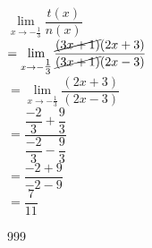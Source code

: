 \documentclass[a4paper]{article}
\newcommand{\llim}{\lim\limits}
\begin{document}
$\llim_{x \rightarrow -\tfrac{1}{3}} \dfrac{t(x)}{n(x)}$ \\ 

$= \llim_{x \rightarrow -\tfrac{1}{3}} \dfrac{\cancel{(3x+1)}(2x+3)}{\cancel{(3x+1)}(2x-3)}$ \\

$= \llim_{x \rightarrow -\tfrac{1}{3}} \dfrac{(2x+3)}{(2x-3)}$ \\

$= \dfrac{\dfrac{-2}{3} + \dfrac{9}{3}}{\dfrac{-2}{3} - \dfrac{9}{3}}$ \\

$= \dfrac{-2+9}{-2-9}$ \\

$= \dfrac{7}{11}$ \\

\begin{thebibliography}{999}
\end{thebibliography}
\end{document}
